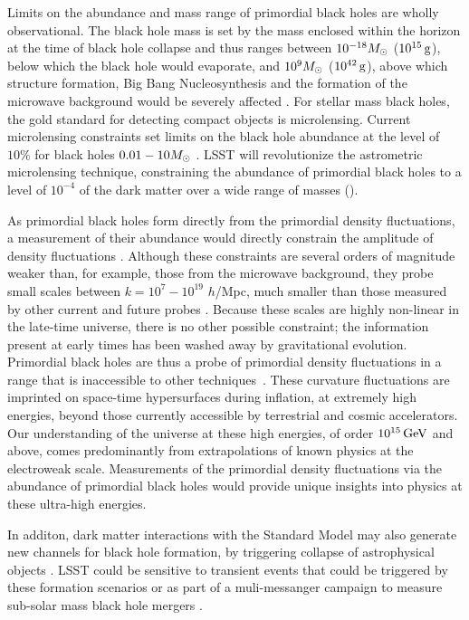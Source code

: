 Limits on the abundance and mass range of primordial black holes are wholly observational. The black hole mass is set by the mass enclosed within the horizon at the time of black hole collapse and thus ranges between $10^{-18} M_\odot$ ($10^{15}\mathrm{\,g}$), below which the black hole would evaporate, and $10^9 M_\odot$ ($10^{42}\mathrm{\,g}$), above which structure formation, Big Bang Nucleosynthesis and the formation of the microwave background would be severely affected \citep{Sasaki:2018}. 
For stellar mass black holes, the gold standard for detecting compact objects is microlensing. Current microlensing constraints set limits on the black hole abundance at the level of $10\%$ for black holes $0.01 - 10 M_\odot$ \citep[however, see][]{Calcino:2018}. LSST will revolutionize the astrometric microlensing technique,  constraining the abundance of primordial black holes to a level of $10^{-4}$ of the dark matter over a wide range of masses ().

As primordial black holes form directly from the primordial density fluctuations, a measurement of their abundance would directly constrain the amplitude of density fluctuations \citep{Carr:1974nx, Meszaros:1974}. %
Although these constraints are several orders of magnitude weaker than, for example, those from the microwave background, they probe small scales between $k = 10^{7} - 10^{19}$ $h$/Mpc, much smaller than those measured by other current and future probes \citep{Bringmann:2012}. Because these scales are highly non-linear in the late-time universe, there is no other possible constraint; the information present at early times has been washed away by gravitational evolution. Primordial black holes are thus a probe of primordial density fluctuations in a range that is inaccessible to other techniques~\citep{Josan:2009,Bellido:2017,Bellido:2018}. These curvature fluctuations are imprinted on space-time hypersurfaces during inflation, at extremely high energies, beyond those currently accessible by terrestrial and cosmic accelerators. 
Our understanding of the universe at these high energies, of order $10^{15} \mathrm{\,GeV}$ and above, comes predominantly from extrapolations of known physics at the electroweak scale.
Measurements of the primordial density fluctuations via the abundance of primordial black holes would provide unique insights into physics at these ultra-high energies.

In additon, dark matter interactions with the Standard Model may also generate new channels for black hole formation, by triggering collapse of astrophysical objects \citep[\eg][]{1989PhRvD..40.3221G,1004.0629,1012.2039,1405.1031,1804.06740}. LSST could be sensitive to transient events that could be triggered by these formation scenarios \citep[\eg][]{1706.00001} or as part of a muli-messanger campaign to measure sub-solar mass black hole mergers \citep[\eg][]{1808.04771,1808.04772}.


